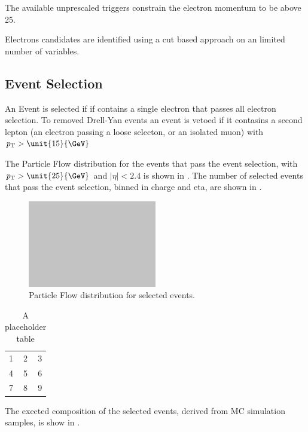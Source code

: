 The available unprescaled triggers constrain the electron momentum to be above
\unit{25}{\GeV}.

Electrons candidates are identified using a cut based approach on an limited
number of variables.


\subsection{Event Selection}

An Event is selected if if contains a single electron that passes all electron
selection.
To removed Drell-Yan events an event is vetoed if it contasins a second lepton
(an electron passing a loose selecton, or an isolated muon) with $\pt > 
\unit{15}{\GeV}$

The Particle Flow \ETm distribution for the events that pass the event
selection, with $\pt > \unit{25}{\GeV}$ and $|\eta| < 2.4$ is shown in
.
The number of selected events that pass the event selection, binned in charge 
and eta, are shown in . 

\begin{figure}[htb]
  \centering
  \includegraphics[width=0.5\textwidth]{placeholder}
  \caption{Particle Flow \ETm distribution for selected events.}
  \label{asym36:pfmet}
\end{figure}

\begin{table}[htb]
  \centering
  \begin{tabular}{| l c r |}
    \hline
    1 & 2 & 3 \\
    4 & 5 & 6 \\
    7 & 8 & 9 \\
  \hline
  \end{tabular}
  \caption{A placeholder table}
  \label{asym36:selectedevents}
\end{table}
                           
The exected composition of the selected events, derived from MC simulation
samples, is show in . 


